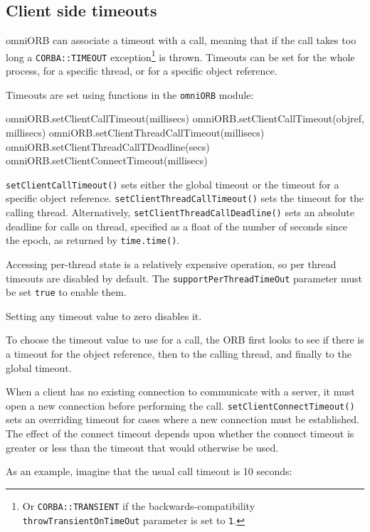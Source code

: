 \documentclass[11pt,oneside,a4paper]{book}
\newcommand{\code}[1]{\texttt{#1}}
\newcommand{\op}[1]{\texttt{#1()}}
\newcommand{\dsc}{\discretionary{}{}{}}
\begin{document}
\subsection{Client side timeouts}
\label{sec:timeoutAPI}

omniORB can associate a timeout with a call, meaning that if the call
takes too long a \code{CORBA::TIMEOUT} exception\footnote{Or
  \code{CORBA::TRANSIENT} if the backwards-compatibility
  \code{throwTransientOnTimeOut} parameter is set to \code{1}.} is
thrown. Timeouts can be set for the whole process, for a specific
thread, or for a specific object reference.

Timeouts are set using functions in the \code{omniORB} module:

\begin{pylisting}
omniORB.setClientCallTimeout(millisecs)
omniORB.setClientCallTimeout(objref, millisecs)
omniORB.setClientThreadCallTimeout(millisecs)
omniORB.setClientThreadCallTDeadline(secs)
omniORB.setClientConnectTimeout(millisecs)
\end{pylisting}

\op{setClientCallTimeout} sets either the global timeout or the
timeout for a specific object reference.
\op{setClientThreadCallTimeout} sets the timeout for the calling
thread. Alternatively, \op{setClientThreadCallDeadline} sets an
absolute deadline for calls on thread, specified as a float of the
number of seconds since the epoch, as returned by \code{time.time()}.

Accessing per-thread state is a relatively expensive operation, so per
thread timeouts are disabled by default. The
\code{supportPerThreadTimeOut} parameter must be set \code{true} to
enable them.

Setting any timeout value to zero disables it.

To choose the timeout value to use for a call, the ORB first looks to
see if there is a timeout for the object reference, then to the
calling thread, and finally to the global timeout.

When a client has no existing connection to communicate with a server,
it must open a new connection before performing the
call. \op{setClientConnect\dsc{}Timeout} sets an overriding timeout for
cases where a new connection must be established. The effect of the
connect timeout depends upon whether the connect timeout is greater
or less than the timeout that would otherwise be used.

\vspace{\baselineskip}\noindent
As an example, imagine that the usual call timeout is 10 seconds:
\end{document}
